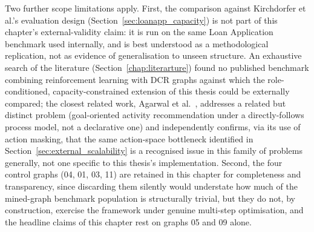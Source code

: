 Two further scope limitations apply. First, the comparison against
Kirchdorfer et al.'s evaluation design
(Section~\ref{sec:loanapp_capacity}) is not part of this chapter's
external-validity claim: it is run on the same Loan Application
benchmark used internally, and is best understood as a methodological
replication, not as evidence of generalisation to unseen structure. An
exhaustive search of the literature (Section~\ref{chap:literarture})
found no published benchmark combining reinforcement learning with
\ac{DCR} graphs against which the role-conditioned, capacity-constrained
extension of this thesis could be externally compared; the closest
related work, Agarwal et al.~\cite{Agarwal2022Goal-OrientedLearning}, addresses
a related but distinct problem (goal-oriented activity recommendation
under a directly-follows process model, not a declarative one) and
independently confirms, via its use of action masking, that the same
action-space bottleneck identified in
Section~\ref{sec:external_scalability} is a recognised issue in this
family of problems generally, not one specific to this thesis's
implementation. Second, the four control graphs (04, 01, 03, 11) are
retained in this chapter for completeness and transparency, since
discarding them silently would understate how much of the mined-graph
benchmark population is structurally trivial, but they do not, by
construction, exercise the framework under genuine multi-step
optimisation, and the headline claims of this chapter rest on graphs
05 and 09 alone.
